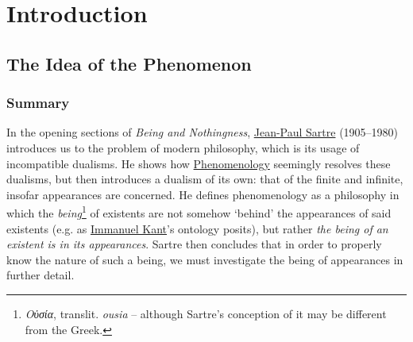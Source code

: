 \chapter{Introduction}

\section{The Idea of the Phenomenon}

\subsection*{Summary}
In the opening sections of \emph{Being and Nothingness}, \href{https://plato.stanford.edu/entries/sartre/}{Jean-Paul Sartre} (1905–1980) introduces us to the problem of modern philosophy,
which is its usage of incompatible dualisms. He shows how \href{https://plato.stanford.edu/entries/phenomenology/}{Phenomenology} seemingly resolves these dualisms, but then introduces a dualism of its own: that of the finite and infinite, insofar appearances are concerned. He defines phenomenology as a philosophy in which the \emph{being}\footnote{\emph{Οὐσία}, translit. \emph{ousia} -- although Sartre's conception of it may be different from the Greek.} of existents are not somehow \enquote*{behind} the appearances of said existents (e.g. as \href{https://plato.stanford.edu/entries/kant/}{Immanuel Kant}'s ontology posits), but rather \emph{the being of an existent is in its appearances}. Sartre then concludes that in order to properly know the nature of such a being, we must investigate the being of appearances in further detail.

